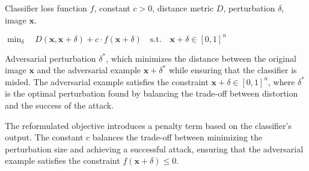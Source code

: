 Classifier loss function $f$, constant $c > 0$, distance metric $D$, perturbation $\delta$, image $\mathbf{x}$.

$\min_{\delta} \quad D(\mathbf{x}, \mathbf{x} + \delta) + c \cdot f(\mathbf{x} + \delta) \quad \text{s.t.} \quad \mathbf{x} + \delta \in [0, 1]^n$

Adversarial perturbation $\delta^*$, which minimizes the distance between the original image $\mathbf{x}$ and the adversarial example $\mathbf{x} + \delta^*$ while ensuring that the classifier is misled. The adversarial example satisfies the constraint $\mathbf{x} + \delta \in [0, 1]^n$, where $\delta^*$ is the optimal perturbation found by balancing the trade-off between distortion and the success of the attack.


The reformulated objective introduces a penalty term based on the classifier’s output. The constant $c$ balances the trade-off between minimizing the perturbation size and achieving a successful attack, ensuring that the adversarial example satisfies the constraint $f(\mathbf{x} + \delta) \leq 0$.